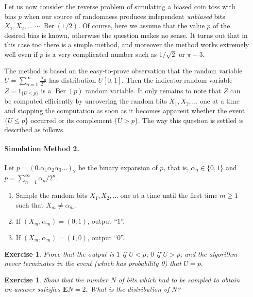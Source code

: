 \documentclass[12pt]{article}
\newtheorem{exercise}[thm]{Exercise}
\newcommand{\expec}{\mathbf{E}}
\newcommand{\berdist}{\operatorname{Ber}}
\theoremstyle{example}
\begin{document}
Let us now consider the reverse problem of simulating a biased coin toss with bias $p$ when our source of randomness produces independent \emph{unbiased} bits $X_1,X_2,\ldots \sim \berdist(1/2)$. Of course, here we assume that the value $p$ of the desired bias is known, otherwise the question makes no sense. It turns out that in this case too there is a simple method, and moreover the method works extremely well even if $p$ is a very complicated number such as $1/\sqrt{2}$ or $\pi-3$.

The method is based on the easy-to-prove observation that the random variable $U=\sum_{n=1}^\infty \frac{X_n}{2^n}$ has distribution $U[0,1]$. Then the indicator random variable $Z = 1_{\{U\le p\}}$ is a $\berdist(p)$ random variable. It only remains to note that $Z$ can be computed efficiently by uncovering the random bits $X_1,X_2,\ldots$ one at a time and stopping the computation as soon as it becomes apparent whether the event $\{U\le p\}$ occurred or its complement $\{U>p\}$. The way this question is settled is described as follows.

\paragraph{Simulation Method 2.} Let $p=(0.\alpha_1 \alpha_2 \alpha_3 \ldots )_2$ be the binary expansion of $p$, that is, $\alpha_n\in \{0,1\}$ and $p=\sum_{n=1}^\infty \alpha_n/2^{n}$.

\begin{enumerate}
\item Sample the random bits $X_1,X_2,\ldots$ one at a time until the first time $m\ge1$ such that $X_m \neq \alpha_m$.
\item If $(X_m,\alpha_m)=(0,1)$, output ``$1$''.
\item If $(X_m,\alpha_m)=(1,0)$, output ``$0$''.
\end{enumerate}

\begin{exercise}
Prove that the output is $1$ if $U< p$; $0$ if $U>p$; and the algorithm never terminates in the event (which has probability 0) that $U=p$.
\end{exercise}

\begin{exercise}
Show that the number $N$ of bits which had to be sampled to obtain an answer satisfies $\expec N = 2$. What is the distribution of $N$?
\end{exercise}
\end{document}
